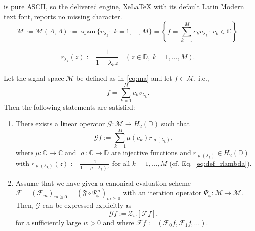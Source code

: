 \documentclass[10pt,a4paper]{amsart}
\newcommand{\cM}{\mathcal{M}}
\newcommand{\funF}{\mathfrak{F}}
\begin{document}
is pure ASCII, so the delivered engine, XeLaTeX with its default Latin Modern text font, reports no missing character.
\begin{equation}
     \label{eq:ma}
     \cM := \mathcal{M}(A,\Lambda) := \operatorname{span} \{v_{\lambda_k}:\ k=1,\ldots,M \} = \left\{ f = \sum_{k=1}^M c_k v_{\lambda_k}: \ c_k \in \mathbb{C}\right\}.
\end{equation}

\begin{equation}\label{eq:def_rlambda}
r_{\lambda_k}(z) := \frac{1}{1-\overline{\lambda_k}z} \quad (z\in \mathbb{D}, \ k=1,\ldots,M).
\end{equation}

\begin{theorem}
\label{thm:ratpron}
    Let the signal space $\cM$ be defined as  in~\eqref{eq:ma} and let $f \in \cM$, i.e.,
    \begin{equation*}
        f = \sum_{k=1}^{M} c_k v_{\lambda_k}.
    \end{equation*}
   Then the following statements are satisfied:
    \begin{enumerate}[label = \alph*)]
    \item There exists a linear operator $\mathcal{G} : \cM \to H_2(\mathbb{D})$ such that
    \begin{equation}
        \label{eq:G}
        \mathcal{G}f := \sum_{k=1}^{M} \mu(c_k) r_{\varrho(\lambda_k)}, 
    \end{equation}
    where $\mu : \mathbb{C} \to \mathbb{C}$ and $\varrho: \mathbb{C} \to \mathbb{D}$ are injective functions and $r_{\varrho(\lambda_k)} \in H_2(\mathbb{D})$ with  $r_{\varrho(\lambda_k)}(z) := \frac{1}{1-\overline{\varrho(\lambda_k)}z}$ for all $k=1,\ldots,M$ (cf. Eq.~\eqref{eq:def_rlambda}).
    \item Assume that we have given a canonical evaluation scheme $\mathcal{F} = {(\mathcal{F}_m)}_{m \ge 0} = {(\funF \circ \Psi_\varphi^m)}_{m \ge 0}$ with an iteration operator $\Psi_\varphi:\cM \to\cM$. Then, $\mathcal{G}$ can be expressed explicitly as
    $$
        \mathcal{G}f := \mathcal{Z}_w[\mathcal{F}f],
    $$
    for a sufficiently large $w > 0$ and where $\mathcal{F}f:=(\mathcal{F}_0f,\mathcal{F}_1f,\ldots)$.
    \end{enumerate}
\end{theorem}
\end{document}
